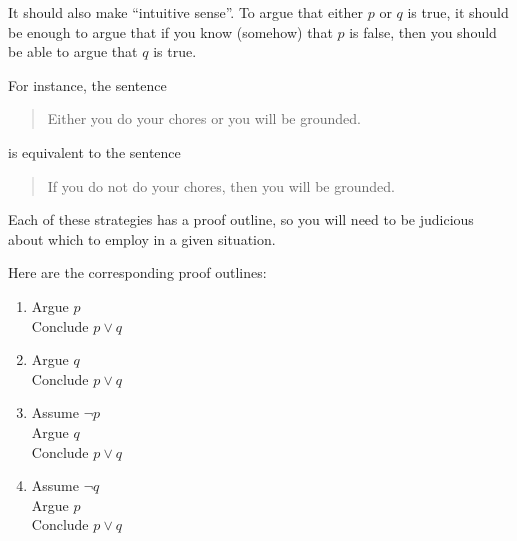 It should also make ``intuitive sense''.  To argue that either $p$ or $q$ is true, it should be enough to argue that if you know (somehow) that $p$ is false, then you should be able to argue that $q$ is true.

For instance, the sentence 

\begin{quote}
		Either you do your chores or you will be grounded.
	\end{quote}

is equivalent to the sentence

\begin{quote}
		If you do not do your chores, then you will be grounded.
	\end{quote}

Each of these strategies has a proof outline, so you will need to be judicious about which to employ in a given situation.

Here are the corresponding proof outlines:

\begin{enumerate}
		\item
	
	\begin{fitch*}
		\textrm{Argue $p$}\\
		\textrm{Conclude $p \vee q$}
	\end{fitch*}
		\item
	
	\begin{fitch*}
		\textrm{Argue  $q$}\\
		\textrm{Conclude $p \vee q$}
	\end{fitch*}
	\item
	
\begin{fitch*}
	\textrm{Assume $\neg p$}\\
	\fa \textrm{Argue $q$}\\
	\textrm{Conclude $p \vee q$}
	\end{fitch*}

	\item

\begin{fitch*}
	\textrm{Assume $\neg q$}\\
	\fa \textrm{Argue $p$}\\
	\textrm{Conclude $p \vee q$}
\end{fitch*}
\end{enumerate}

\newpage

